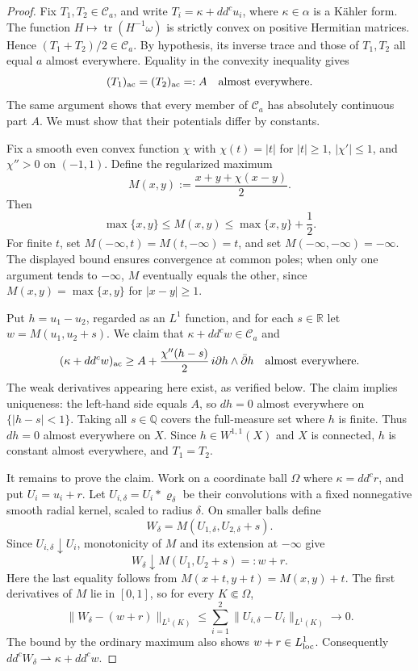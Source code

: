 \documentclass[reqno]{amsart}
\numberwithin{equation}{section}
\theoremstyle{definition}
\DeclareMathOperator{\tr}{tr}
\begin{document}
\begin{proof}
Fix $T_1,T_2\in\mathcal C_a$, and write
$T_i=\kappa+dd^cu_i$, where $\kappa\in\alpha$ is a K\"ahler form.
The function $H\mapsto\tr(H^{-1}\omega)$ is strictly
convex on positive Hermitian matrices. Hence $(T_1+T_2)/2\in\mathcal C_a$.
By hypothesis, its inverse trace and those of $T_1,T_2$ all equal $a$
almost everywhere. Equality in the convexity inequality gives
\begin{equation}\label{eq:equal-densities}
(T_1)_{\rm ac}=(T_2)_{\rm ac}=:A
\quad\hbox{almost everywhere}.
\end{equation}
The same argument shows that every member of $\mathcal C_a$ has
absolutely continuous part $A$. We must show that their potentials
differ by constants.

Fix a smooth even convex function $\chi$ with
$\chi(t)=|t|$ for $|t|\ge1$, $|\chi'|\le1$, and
$\chi''>0$ on $(-1,1)$. Define the regularized maximum
\[
M(x,y):=\frac{x+y+\chi(x-y)}2.
\]
Then \[
\max\{x,y\}\le M(x,y)\le\max\{x,y\}+\frac12.
\]
For finite $t$, set
$M(-\infty,t)=M(t,-\infty)=t$, and set
$M(-\infty,-\infty)=-\infty$.
The displayed bound ensures convergence at common poles; when only
one argument tends to $-\infty$, $M$ eventually equals the other,
since $M(x,y)=\max\{x,y\}$ for $|x-y|\ge1$.

Put $h=u_1-u_2$, regarded as an $L^1$ function, and for each
$s\in\mathbb R$ let $w=M(u_1,u_2+s)$.
We claim that $\kappa+dd^cw\in\mathcal C_a$ and
\begin{equation}\label{eq:uniqueness-gradient}
(\kappa+dd^cw)_{\rm ac}
\ge A+\frac{\chi''(h-s)}2\,i\partial h\wedge\bar\partial h
\quad\hbox{almost everywhere}.
\end{equation}
The weak derivatives appearing here exist, as verified below.
The claim implies uniqueness: the left-hand side equals $A$,
so $dh=0$ almost everywhere on $\{|h-s|<1\}$.
Taking all $s\in\mathbb Q$ covers the full-measure set where $h$ is
finite. Thus $dh=0$ almost everywhere on $X$.
Since $h\in W^{1,1}(X)$ and $X$ is connected, $h$ is constant
almost everywhere, and $T_1=T_2$.

It remains to prove the claim. Work on a coordinate ball
$\Omega$ where $\kappa=dd^cr$, and put $U_i=u_i+r$.
Let $U_{i,\delta}=U_i*\varrho_\delta$ be their convolutions with a fixed
nonnegative smooth radial kernel, scaled to radius
$\delta$. On smaller balls define
\[
W_\delta=M(U_{1,\delta},U_{2,\delta}+s).
\]
Since $U_{i,\delta}\downarrow U_i$, monotonicity of $M$ and its
extension at $-\infty$ give
\[
W_\delta\downarrow M(U_1,U_2+s)=:w+r.
\]
Here the last equality follows from
$M(x+t,y+t)=M(x,y)+t$.
The first derivatives of $M$ lie in $[0,1]$, so for every
$K\Subset\Omega$,
\[
\|W_\delta-(w+r)\|_{L^1(K)}
\le\sum_{i=1}^2\|U_{i,\delta}-U_i\|_{L^1(K)}
\longrightarrow0.
\]
The bound by the ordinary maximum also shows $w+r\in L^1_{\rm loc}$.
Consequently $dd^cW_\delta\rightharpoonup\kappa+dd^cw$.


\end{proof}
\end{document}
